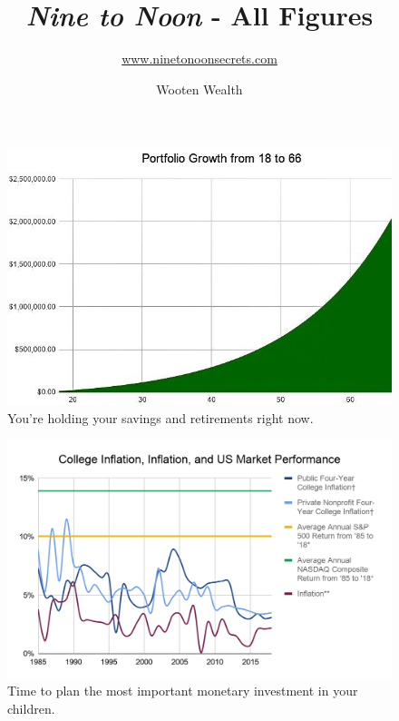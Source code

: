 \documentclass{article}
\title{\vspace{-.5cm}\textit{Nine to Noon} - All Figures}
\author{\href{https://www.ninetonoonsecrets.com}{www.ninetonoonsecrets.com}}
\date{Wooten Wealth}
\begin{document}
\maketitle
\thispagestyle{empty}

\begin{figure}[!htb]
    \centering
\end{figure}

\pagebreak

\begin{figure}[!htb]
    \centering
    \includegraphics[width=1\textwidth]{imgs/1.png}
    \caption{You're holding your savings and retirements right now.}
\end{figure}

\vspace{10pt}

\begin{figure}[!htb]
    \centering
    \includegraphics[width=\textwidth]{imgs/2.png}
    \caption{Time to plan the most important monetary investment in your children.}
\end{figure}
\end{document}
